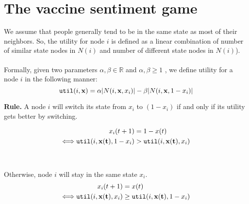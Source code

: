 \section{The vaccine sentiment game}



We assume that people generally tend to be in the same state as most of their neighbors. So, the utility for node $i$ is defined as a linear combination of number of similar state nodes in $N(i)$ and  number of different state nodes in $N(i)$).
\\
\\
Formally, given two parameters $\alpha, \beta \in \mathbb{R}$ and $\alpha, \beta \geq  1$ , we define utility for a node $i$ in the following manner:
\begin{equation}
\label{eq:util_normal}
\texttt{util}(i, \mathbf{x})=\alpha|N(i, \mathbf{x}, x_i)| - \beta|N(i, \mathbf{x}, 1-x_i)|
\end{equation}

\textbf{Rule.} A node $i$ will switch its state from $x_i$ to $(1-x_i)$ if and only if its utility gets better by switching.

\begin{align}
    x_i(t+1) &= 1-x(t)\\
    \Longleftrightarrow \texttt{util}(i, \mathbf{x(t)}, 1-x_i) &> \texttt{util}(i, \mathbf{x(t)}, x_i)
\end{align}
\\
\\
Otherwise, node $i$ will stay in the same state $x_i$.
\begin{align}
    x_i(t+1) &= x(t)\\
    \Longleftrightarrow \texttt{util}(i, \mathbf{x(t)}, x_i) & \geq \texttt{util}(i, \mathbf{x(t)}, 1-x_i)
\end{align}

\endinput